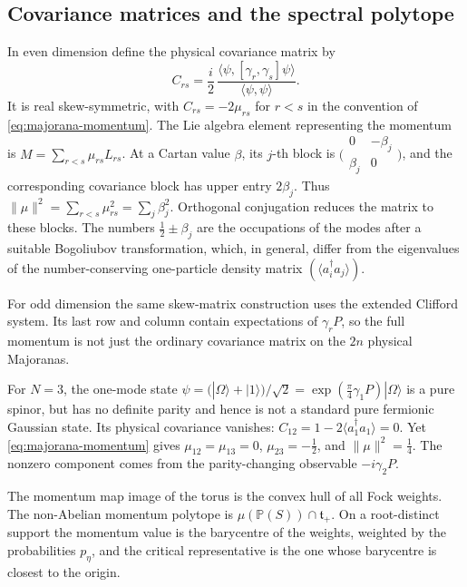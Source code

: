 \documentclass{article}
\theoremstyle{definition}
\theoremstyle{remark}
\newcommand{\vac}{|\Omega\rangle}
\newcommand{\PP}{\mathbb P}
\newcommand{\ket}[1]{\lvert #1\rangle}
\newcommand{\norm}[1]{\lVert #1\rVert}
\begin{document}
\subsection{Covariance matrices and the spectral polytope}

In even dimension define the physical covariance matrix
\cite{Bravyi2005} by
\begin{equation*}
 C_{rs}=\frac{i}{2}\,
 \frac{\langle\psi,[\gamma_r,\gamma_s]\psi\rangle}
      {\langle\psi,\psi\rangle}.
\end{equation*}
It is real skew-symmetric, with $C_{rs}=-2\mu_{rs}$ for $r<s$
in the convention of \eqref{eq:majorana-momentum}. The Lie algebra element
representing the momentum is $M=\sum_{r<s}\mu_{rs}L_{rs}$. At a Cartan
value $\beta$, its $j$-th block is
$\bigl(\begin{smallmatrix}0&-\beta_j\\\beta_j&0\end{smallmatrix}\bigr)$,
and the corresponding covariance block has upper entry $2\beta_j$.
Thus $\norm\mu^2=\sum_{r<s}\mu_{rs}^2=\sum_j\beta_j^2$.
Orthogonal conjugation reduces the matrix to these blocks.
The numbers
$\frac12\pm\beta_j$ are the occupations of the modes after a suitable
Bogoliubov transformation, which, in general, differ from the eigenvalues of
the number-conserving one-particle density matrix $(\langle a_i^\dagger a_j\rangle)$.

For odd dimension the same skew-matrix construction uses the extended
Clifford system. Its last row and column contain expectations of
$\gamma_rP$, so the full momentum is not just the ordinary covariance
matrix on the $2n$ physical Majoranas.

For $N=3$, the one-mode state
$\psi=(\vac+\ket1)/\sqrt2=\exp(\frac\pi4\gamma_1P)\vac$
is a pure spinor, but has no definite parity and hence is not a standard
pure fermionic Gaussian state. Its physical covariance vanishes:
$C_{12}=1-2\langle a_1^\dagger a_1\rangle=0$.
Yet \eqref{eq:majorana-momentum} gives $\mu_{12}=\mu_{13}=0$,
$\mu_{23}=-\frac12$, and $\norm\mu^2=\frac14$.
The nonzero component comes from the parity-changing observable $-i\gamma_2P$.

The momentum map image of the torus is the convex hull of all Fock weights. The
non-Abelian momentum polytope is
$\mu(\PP(S))\cap\mathfrak t_+$. On a root-distinct support the momentum value is the
barycentre of the weights, weighted by the probabilities $p_\eta$, and the
critical representative is the one whose barycentre is closest to the origin.
\end{document}
